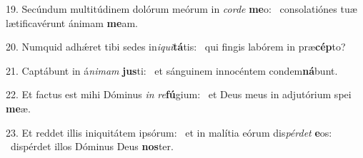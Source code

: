 19. Secúndum multitúdinem dolórum meórum in \textit{cor}\textit{de} \textbf{me}o: \ast\  consolatiónes tuæ lætificavérunt ánimam \textbf{me}am.\

20. Numquid adhǽret tibi sedes in\textit{i}\textit{qui}\textbf{tá}tis: \ast\  qui fingis labórem in præ\textbf{cép}to?\

21. Captábunt in á\textit{ni}\textit{mam} \textbf{jus}ti: \ast\  et sánguinem innocéntem condem\textbf{ná}bunt.\

22. Et factus est mihi Dóminus \textit{in} \textit{re}\textbf{fú}gium: \ast\  et Deus meus in adjutórium spei \textbf{me}æ.\

23. Et reddet illis iniquitátem ipsórum: \dag\  et in malítia eórum dis\textit{pér}\textit{det} \textbf{e}os: \ast\  dispérdet illos Dóminus Deus \textbf{nos}ter.\

